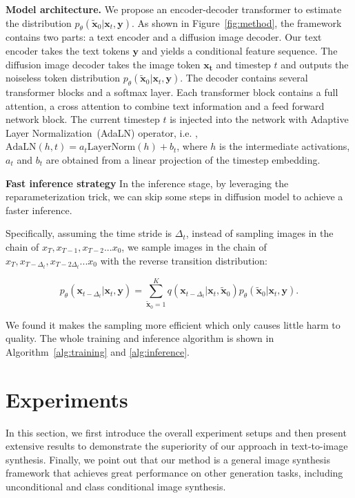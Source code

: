 \textbf{Model architecture.} We propose an encoder-decoder transformer to estimate the distribution $p_\theta(\tilde{\bm{x}}_0 | \bm{x}_t,\bm{y})$. As shown in Figure~\ref{fig:method}, the framework contains two parts: a text encoder and a diffusion image decoder. Our text encoder takes the text tokens $\bm{y}$ and yields a conditional feature sequence. The diffusion image decoder takes the image token $\bm{x_t}$ and timestep $t$ and outputs the noiseless token distribution $p_\theta(\tilde{\bm{x}}_0 | \bm{x}_t,\bm{y})$. The decoder contains several transformer blocks and a softmax layer. Each transformer block contains a full attention, a cross attention to combine text information and a feed forward network block. The current timestep $t$ is injected into the network with Adaptive Layer Normalization~\cite{ba2016layer}(AdaLN) operator, i.e. , $\text{AdaLN}(h, t) = a_t\text{LayerNorm}(h) + b_t$, where $h$ is the intermediate activations, $a_t$ and $b_t$ are obtained from a linear projection of the timestep embedding. 

\textbf{Fast inference strategy} In the inference stage, by leveraging the reparameterization trick, we can skip some steps in diffusion model to achieve a faster inference. 

Specifically, assuming the time stride is $\Delta_t$, instead of sampling images in the chain of $x_T, x_{T-1},x_{T-2} ... x_0$, we sample images in the chain of  $x_T, x_{T-\Delta_t},x_{T-2\Delta_t} ... x_0$ with the reverse transition distribution:

\begin{equation}
	p_\theta(\bm{x}_{t-{\Delta_t}}|\bm{x}_t,\bm{y}) = \sum_{\tilde{\bm{x}}_0=1}^{K} q(\bm{x}_{t-{\Delta_t}}|\bm{x}_t,\tilde{\bm{x}}_0) p_\theta(\tilde{\bm{x}}_0|\bm{x}_t, \bm{y}).
	\label{eqn:fast_inference}
\end{equation}

We found it makes the sampling more efficient which only causes little harm to quality. The whole training and inference algorithm is shown in Algorithm~\ref{alg:training} and \ref{alg:inference}.

\section{Experiments}

In this section, we first introduce the overall experiment setups and then present extensive results to demonstrate the superiority of our approach in text-to-image synthesis. Finally, we point out that our method is a general image synthesis framework that achieves great performance on other generation tasks, including unconditional and class conditional image synthesis.

